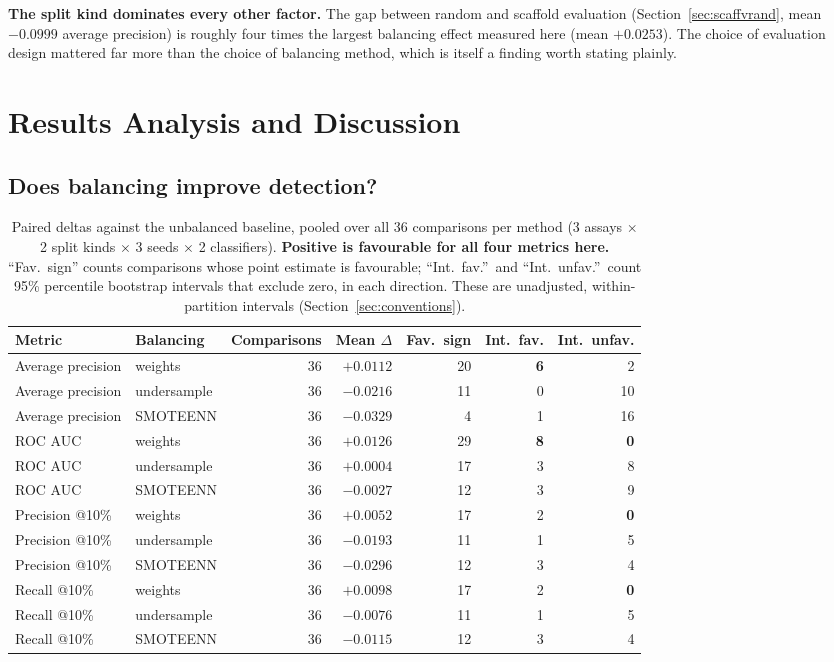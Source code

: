 \documentclass[10pt,letterpaper]{article}
\newcommand{\dd}{$\Delta$}
\begin{document}
\textbf{The split kind dominates every other factor.} The gap between random and scaffold evaluation
(Section~\ref{sec:scaffvrand}, mean $-0.0999$ average precision) is roughly four times the largest
balancing effect measured here (mean $+0.0253$). The choice of evaluation design mattered far more
than the choice of balancing method, which is itself a finding worth stating plainly.

\section{Results Analysis and Discussion}
\label{sec:results}

\subsection{Does balancing improve detection?}
\label{sec:detect}

\begin{table}[!htbp]
\centering
\small
\caption{Paired deltas against the unbalanced baseline, pooled over all 36 comparisons per method
(3 assays $\times$ 2 split kinds $\times$ 3 seeds $\times$ 2 classifiers). \textbf{Positive is
favourable for all four metrics here.} ``Fav.\ sign'' counts comparisons whose point estimate is
favourable; ``Int.\ fav.''\ and ``Int.\ unfav.''\ count 95\% percentile bootstrap intervals that
exclude zero, in each direction. These are unadjusted, within-partition intervals
(Section~\ref{sec:conventions}).}
\label{tab:tally36}
\begin{tabular}{@{}llrrrrr@{}}
\toprule
Metric & Balancing & Comparisons & Mean \dd{} & Fav.\ sign & Int.\ fav. & Int.\ unfav. \\
\midrule
Average precision & weights     & 36 & $+0.0112$ & 20 & \textbf{6} & 2 \\
Average precision & undersample & 36 & $-0.0216$ & 11 & 0 & 10 \\
Average precision & SMOTEENN    & 36 & $-0.0329$ & 4  & 1 & 16 \\
\midrule
ROC AUC & weights     & 36 & $+0.0126$ & 29 & \textbf{8} & \textbf{0} \\
ROC AUC & undersample & 36 & $+0.0004$ & 17 & 3 & 8 \\
ROC AUC & SMOTEENN    & 36 & $-0.0027$ & 12 & 3 & 9 \\
\midrule
Precision @10\% & weights     & 36 & $+0.0052$ & 17 & 2 & \textbf{0} \\
Precision @10\% & undersample & 36 & $-0.0193$ & 11 & 1 & 5 \\
Precision @10\% & SMOTEENN    & 36 & $-0.0296$ & 12 & 3 & 4 \\
\midrule
Recall @10\% & weights     & 36 & $+0.0098$ & 17 & 2 & \textbf{0} \\
Recall @10\% & undersample & 36 & $-0.0076$ & 11 & 1 & 5 \\
Recall @10\% & SMOTEENN    & 36 & $-0.0115$ & 12 & 3 & 4 \\
\bottomrule
\end{tabular}
\end{table}
\end{document}
